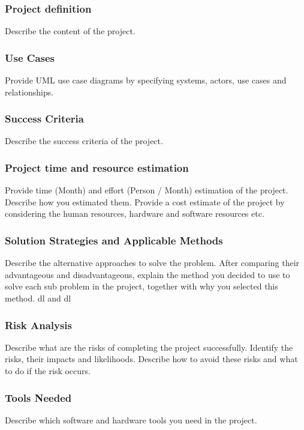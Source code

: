 \documentclass{mefsdp}
\begin{document}
	\subsubsection{Project definition}
	Describe the content of the project. 
	
	\subsubsection{Use Cases}
	Provide UML use case diagrams by specifying systems, actors, use cases and relationships. \cite{kahneman2011thinking}
	
	\subsubsection{Success Criteria}
	Describe the success criteria of the project. 
	
	\subsubsection{Project time and resource estimation}
	Provide time (Month) and effort (Person / Month) estimation of the project. Describe how you estimated them. Provide a cost estimate of the project by considering the human resources, hardware and software resources etc.
	
	\subsubsection{Solution Strategies and Applicable Methods}
	Describe the alternative approaches to solve the problem. After comparing their advantageous and disadvantageous, explain the method you decided to use to solve each sub problem in the project, together with why you selected this method. \gls{dl} and \gls{dl}
	
	\subsubsection{Risk Analysis}
	Describe what are the risks of completing the project successfully. Identify the risks, their impacts and likelihoods. Describe how to avoid these risks and what to do if the risk occurs. \cite{duan2017question}
	
	\subsubsection{Tools Needed}
	Describe which software and hardware tools you need in the project.
	\cite{rothstein2017color}
	
\end{document}
